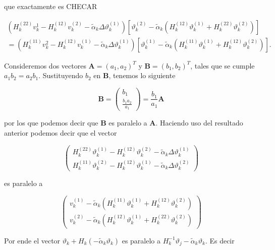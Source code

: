 que exactamente es  CHECAR

\begin{align*}
	(H_k^{(22)}v_k^{1}-H_k^{(12)}v_k^{(2)}-\tilde{\alpha}_k\Delta\vartheta_k^{(1)})[\vartheta_k ^{(2)}-\tilde{\alpha}_k(H_k^{(12)}\vartheta_k^{(1)}+H_k^{(22)}\vartheta_k^{(2)})] \\
	= (H_k^{(11)}v_k^{2}-H_k^{(12)}v_k^{(1)}-\tilde{\alpha}_k\Delta\vartheta_k^{(1)})[\vartheta_k ^{(1)}-\tilde{\alpha}_k(H_k^{(11)}\vartheta_k^{(1)}+H_k^{(12)}\vartheta_k^{(2)})].
\end{align*}

Consideremos dos vectores $\boldsymbol{A} = (a_1, a_2)^T$ y $\boldsymbol{B} = (b_1, b_2)^T$, tales que se cumple $a_1b_2 = a_2b_1$. Sustituyendo $b_2$ en $\boldsymbol{B}$, tenemos lo siguiente

\begin{equation*}
	\boldsymbol{B} = \begin{pmatrix}
		b_1 \\
		\frac{b_1a_2}{a_1}
	\end{pmatrix} = \frac{b_1}{a_1}\boldsymbol{A}
\end{equation*}

por los que podemos decir que $\boldsymbol{B}$ es paralelo a $\boldsymbol{A}$. Haciendo uso del resultado anterior podemos decir que el vector

\begin{equation*}
	\begin{pmatrix}
		H_k^{(22)}\vartheta_k^{(1)}-H_k^{(12)}\vartheta_k^{(2)}-\tilde{\alpha}_k\Delta\vartheta_k^{(1)} \\[0.25cm]
		H_k^{(11)}\vartheta_k^{(2)}-H_k^{(12)}\vartheta_k^{(1)}-\tilde{\alpha}_k\Delta\vartheta_k^{(2)}
	\end{pmatrix}
\end{equation*}

es paralelo a

\begin{equation*}
	\begin{pmatrix}
		v_k^{(1)} - \tilde{\alpha}_k(H_k^{(11)}\vartheta_k^{(1)}+H_k^{(12)}\vartheta_k^{(2)}) \\[0.25cm]
		v_k^{(2)} - \tilde{\alpha}_k(H_k^{(12)}\vartheta_k^{(1)}+H_k^{(22)}\vartheta_k^{(2)})
	\end{pmatrix}
\end{equation*}

Por ende el vector $\vartheta_k+H_k(-\tilde{\alpha}_k\vartheta_k)$ es paralelo a  $H_k^{-1}\vartheta_j-\tilde{\alpha}_k\vartheta_k$. Es decir

